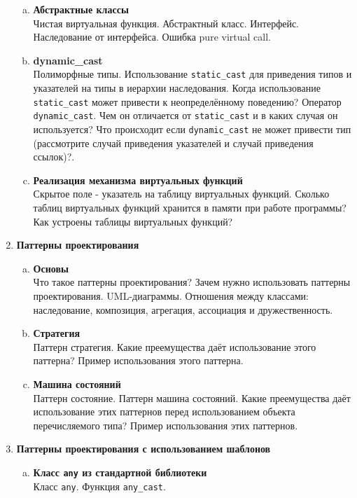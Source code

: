 \documentclass{article}
\begin{document}
\begin{enumerate}
\begin{enumerate}[a.]
\item \textbf{Абстрактные классы}\\
Чистая виртуальная функция. Абстрактный класс. Интерфейс. Наследование от интерфейса. Ошибка pure virtual call.

\item \textbf{dynamic\_cast}\\
Полиморфные типы.  Использование \texttt{static\_cast} для приведения типов и указателей на типы в иерархии наследования. Когда использование \texttt{static\_cast} может привести к неопределённому поведению? Оператор \texttt{dynamic\_cast}. Чем он отличается от \texttt{static\_cast} и в каких случая он используется? Что происходит если \texttt{dynamic\_cast} не может привести тип (рассмотрите случай приведения указателей и случай приведения ссылок)?.


\item \textbf{Реализация механизма виртуальных функций}\\
Скрытое поле - указатель на таблицу виртуальных функций.
Сколько таблиц виртуальных функций хранится в памяти при работе программы? Как устроены таблицы виртуальных функций?
\end{enumerate}




\item \textbf{Паттерны проектирования}
\begin{enumerate}[a.]
\item \textbf{Основы}\\
Что такое паттерны проектирования? Зачем нужно использовать паттерны проектирования. UML-диаграммы. Отношения между классами: наследование, композиция, агрегация, ассоциация и дружественность.


\item \textbf{Стратегия}\\
Паттерн стратегия. Какие преемущества даёт использование этого паттерна? Пример использования этого паттерна.

\item \textbf{Машина состояний}\\
Паттерн состояние. Паттерн машина состояний. Какие преемущества даёт использование этих паттернов перед использованием объекта перечисляемого типа?  Пример использования этих паттернов.
\end{enumerate}



\item \textbf{Паттерны проектирования с использованием шаблонов}
\begin{enumerate}[a.]
\item \textbf{Класс \texttt{any} из стандартной библиотеки}\\
Класс \texttt{any}. Функция \texttt{any\_cast}. 



\end{enumerate}
\end{enumerate}
\end{document}
